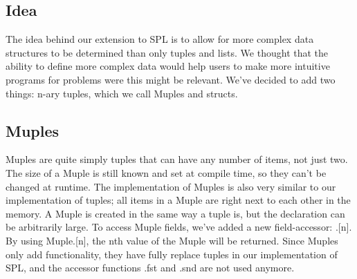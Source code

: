 \documentclass[10pt,a4paper]{article}
\begin{document}
\subsection{Idea}
The idea behind our extension to SPL is to allow for more complex data structures to be determined than only tuples and lists. We thought that the ability to define more complex data would help users to make more intuitive programs for problems were this might be relevant. We've decided to add two things: n-ary tuples, which we call Muples and structs. 
\subsection{Muples}
Muples are quite simply tuples that can have any number of items, not just two. The size of a Muple is still known and set at compile time, so they can't be changed at runtime. The implementation of Muples is also very similar to our implementation of tuples; all items in a Muple are right next to each other in the memory. A Muple is created in the same way a tuple is, but the declaration can be arbitrarily large. To access Muple fields, we've added a new field-accessor: .[n]. By using Muple.[n], the nth value of the Muple will be returned. Since Muples only add functionality, they have fully replace tuples in our implementation of SPL, and the accessor functions .fst and .snd are not used anymore.
\end{document}
